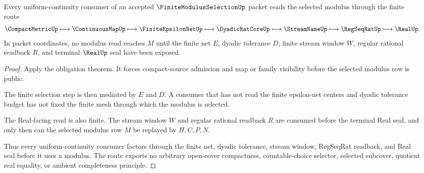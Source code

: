\begin{theorem}
\label{thm:finite-modulus-selection-dyadic-net-route}
Every uniform-continuity consumer of an accepted $\FiniteModulusSelectionUp$ packet reads the selected modulus through the finite route
$$
\CompactMetricUp \longmapsto \ContinuousMapUp \longmapsto \FiniteEpsilonNetUp \longmapsto \DyadicRatCoreUp \longmapsto \StreamNameUp \longmapsto \RegSeqRatUp \longmapsto \RealUp .
$$
In packet coordinates, no modulus read reaches $M$ until the finite net $E$, dyadic tolerance $D$, finite stream window $W$, regular rational readback $R$, and terminal $\RealUp$ seal have been exposed.
\end{theorem}
\begin{proof}
Apply the obligation theorem. It forces compact-source admission and map or family visibility before the selected modulus row is public.

The finite selection step is then mediated by $E$ and $D$. A consumer that has not read the finite epsilon-net centers and dyadic tolerance budget has not fixed the finite mesh through which the modulus is selected.

The Real-facing read is also finite. The stream window $W$ and regular rational readback $R$ are consumed before the terminal Real seal, and only then can the selected modulus row $M$ be replayed by $H,C,P,N$.

Thus every uniform-continuity consumer factors through the finite net, dyadic tolerance, stream window, RegSeqRat readback, and Real seal before it uses a modulus. The route exports no arbitrary open-cover compactness, countable-choice selector, selected subcover, quotient real equality, or ambient completeness principle.
\end{proof}


